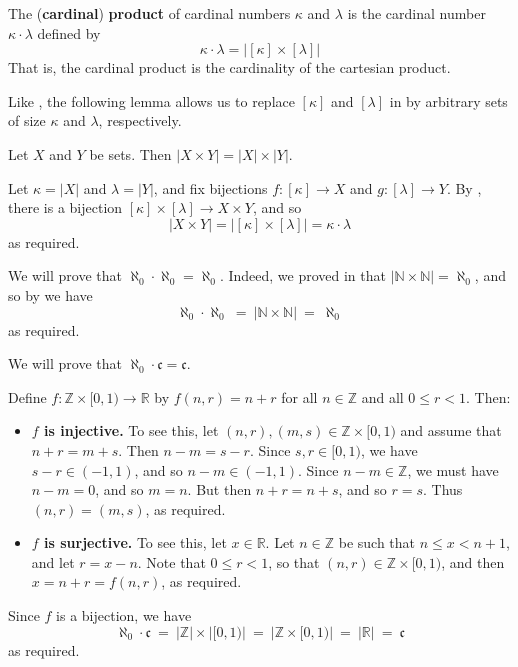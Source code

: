 \begin{definition}
\label{defCardinalProduct}
The (\textbf{cardinal}) \textbf{product} of cardinal numbers $\kappa$ and $\lambda$ is the cardinal number $\kappa \cdot \lambda$ defined by
\[ \kappa \cdot \lambda = |[\kappa] \times [\lambda]| \]
That is, the cardinal product is the cardinality of the cartesian product.
\end{definition}

Like , the following lemma allows us to replace $[\kappa]$ and $[\lambda]$ in  by arbitrary sets of size $\kappa$ and $\lambda$, respectively.

\begin{lemma}
\label{lemCardinalityOfProductOfSets}
Let $X$ and $Y$ be sets. Then $|X \times Y| = |X| \times |Y|$.
\end{lemma}

\begin{cproof}
Let $\kappa = |X|$ and $\lambda = |Y|$, and fix bijections $f : [\kappa] \to X$ and $g : [\lambda] \to Y$. By , there is a bijection $[\kappa] \times [\lambda] \to X \times Y$, and so
\[ |X \times Y| = |[\kappa] \times [\lambda]| = \kappa \cdot \lambda \]
as required.
\end{cproof}

\begin{example}
\label{exAlephNaughtTimesAlephNaughtEqualsAlephNaught}
We will prove that $\aleph_0 \cdot \aleph_0 = \aleph_0$. Indeed, we proved in  that $|\mathbb{N} \times \mathbb{N}| = \aleph_0$, and so by  we have
\[ \aleph_0 \cdot \aleph_0 ~=~ |\mathbb{N} \times \mathbb{N}| ~=~ \aleph_0 \]
as required.
\end{example}

\begin{example}
We will prove that $\aleph_0 \cdot \mathfrak{c} = \mathfrak{c}$.

Define $f : \mathbb{Z} \times [0,1) \to \mathbb{R}$ by $f(n,r) = n+r$ for all $n \in \mathbb{Z}$ and all $0 \le r < 1$. Then:
\begin{itemize}
\item \textbf{$f$ is injective.} To see this, let $(n,r), (m,s) \in \mathbb{Z} \times [0,1)$ and assume that $n+r=m+s$. Then $n-m=s-r$. Since $s,r \in [0,1)$, we have $s-r \in (-1,1)$, and so $n-m \in (-1,1)$. Since $n-m \in \mathbb{Z}$, we must have $n-m = 0$, and so $m=n$. But then $n+r=n+s$, and so $r=s$. Thus $(n,r) = (m,s)$, as required.
\item \textbf{$f$ is surjective.} To see this, let $x \in \mathbb{R}$. Let $n \in \mathbb{Z}$ be such that $n \le x < n+1$, and let $r = x-n$. Note that $0 \le r < 1$, so that $(n,r) \in \mathbb{Z} \times [0,1)$, and then $x = n+r = f(n,r)$, as required.
\end{itemize}

Since $f$ is a bijection, we have
\[ \aleph_0 \cdot \mathfrak{c} ~=~ |\mathbb{Z}| \times |[0,1)| ~=~ |\mathbb{Z} \times [0,1)| ~=~ |\mathbb{R}| ~=~ \mathfrak{c} \]
as required.
\end{example}

